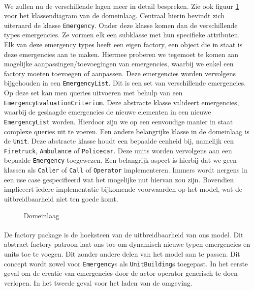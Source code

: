 \paragraph{}
We zullen nu de verschillende lagen meer in detail bespreken. Zie ook figuur \ref{domein} voor het klassendiagram van de domeinlaag.
Centraal hierin bevindt zich uiteraard de klasse \verb+Emergency+.
Onder deze klasse komen dan de verschillende types emergencies. Ze vormen elk een subklasse met hun specifieke attributen.
Elk van deze emergency types heeft een eigen factory, een object die in staat is deze emergencies aan te maken.
Hiermee proberen we tegemoet te komen aan mogelijke aanpassingen/toevoegingen van emergencies, waarbij we enkel een factory moeten toevoegen of aanpassen.
Deze emergencies worden vervolgens bijgehouden in een \verb+EmergencyList+. Dit is een set van verschillende emergencies.
Op deze set kan men queries uitvoeren met behulp van een \verb+EmergencyEvaluationCriterium+.
Deze abstracte klasse valideert emergencies, waarbij de geslaagde emergencies de nieuwe elementen in een nieuwe \verb+EmergencyList+ worden.
Hierdoor zijn we op een eenvoudige manier in staat complexe queries uit te voeren. Een andere belangrijke klasse in de domeinlaag is de \verb+Unit+.
Deze abstracte klasse houdt een bepaalde eenheid bij, namelijk een \verb+Firetruck+, \verb+Ambulance+ of \verb+Policecar+.
Deze units worden vervolgens aan een bepaalde \verb+Emergency+ toegewezen.
Een belangrijk aspect is hierbij dat we geen klassen als \verb+Caller+ of \verb+Call+ of \verb+Operator+ implementeren.
Immers wordt nergens in een use case gespecifieerd wat het mogelijke nut hiervan zou zijn.
Bovendien impliceert iedere implementatie bijkomende voorwaarden op het model, wat de uitbreidbaarheid niet ten goede komt.
\begin{figure}[H]
    \centering
    \caption{Domeinlaag}
    \label{domein}
\end{figure}
\paragraph{}
De factory package is de hoeksteen van de uitbreidbaarheid van ons model.
Dit abstract factory patroon laat ons toe om dynamisch nieuwe typen emergencies en units toe te voegen.
Dit zonder andere delen van het model aan te passen. Dit concept wordt zowel voor \verb+Emergency+s als \verb+UnitBuilding+s toegepast.
In het eerste geval om de creatie van emergencies door de actor operator generisch te doen verlopen.
In het tweede geval voor het laden van de omgeving.
